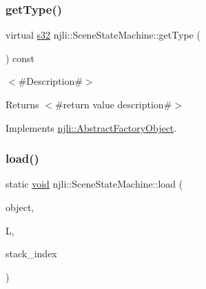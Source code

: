 \mbox{\label{classnjli_1_1_scene_state_machine_a26b4b620f64b21d9731c0114f2943cfa}} 
\subsubsection{\texorpdfstring{get\+Type()}{getType()}}
{\footnotesize\ttfamily virtual \mbox{\hyperlink{_util_8h_aa62c75d314a0d1f37f79c4b73b2292e2}{s32}} njli\+::\+Scene\+State\+Machine\+::get\+Type (\begin{DoxyParamCaption}{ }\end{DoxyParamCaption}) const\hspace{0.3cm}{\ttfamily [virtual]}}

$<$\#\+Description\#$>$

\begin{DoxyReturn}{Returns}
$<$\#return value description\#$>$ 
\end{DoxyReturn}


Implements \mbox{\hyperlink{classnjli_1_1_abstract_factory_object_a207c86146d40d0794708ae7f2d4e60a7}{njli\+::\+Abstract\+Factory\+Object}}.

\mbox{\label{classnjli_1_1_scene_state_machine_a8263efd65894599a95b65e45c2f161b5}} 
\subsubsection{\texorpdfstring{load()}{load()}}
{\footnotesize\ttfamily static \mbox{\hyperlink{_thread_8h_af1e856da2e658414cb2456cb6f7ebc66}{void}} njli\+::\+Scene\+State\+Machine\+::load (\begin{DoxyParamCaption}\item[{\mbox{\hyperlink{classnjli_1_1_scene_state_machine}{Scene\+State\+Machine}} \&}]{object,  }\item[{lua\+\_\+\+State $\ast$}]{L,  }\item[{int}]{stack\+\_\+index }\end{DoxyParamCaption})\hspace{0.3cm}{\ttfamily [static]}}

